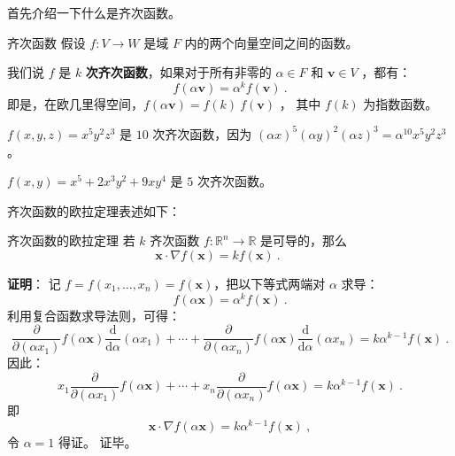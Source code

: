 
\begin{issues}
\end{issues}



首先介绍一下什么是齐次函数。

\begin{definition}{齐次函数}
假设 $f: V \to W $ 是域 $ F $ 内的两个向量空间之间的函数。

我们说 $f$ 是 $k$ \textbf{次齐次函数}，如果对于所有非零的 $\alpha \in F$ 和 $\mathbf{v} \in V$ ，都有：
\begin{equation}
f(\alpha \mathbf{v}) = \alpha^k f(\mathbf{v}) ~.
\end{equation}
即是，在欧几里得空间，$f(\alpha \mathbf{v}) = f(k) \ f(\mathbf{v})$ ， 其中 $f(k)$ 为指数函数。
\end{definition}

\begin{example}{}
$f(x,y,z)=x^5y^2z^3$ 是 $10$ 次齐次函数，因为 $(\alpha x)^5(\alpha y)^2(\alpha z)^3=\alpha^{10}x^5y^2z^3$。

$f(x,y)=x^5 + 2 x^3 y^2 + 9 x y^4$ 是 $5$ 次齐次函数。
\end{example}

齐次函数的欧拉定理表述如下：

\begin{theorem}{齐次函数的欧拉定理}
若 $k$ 齐次函数 $ f:\mathbb{R}^n \to \mathbb{R}$ 是可导的，那么
\begin{equation}
{\displaystyle \mathbf {x} \cdot \nabla f(\mathbf {x} )=kf(\mathbf {x} )~.\qquad }
\end{equation}
\end{theorem}
\textbf{证明}： 记 $f=f(x_{1},\ldots ,x_{n})=f(\mathbf {x} )$，把以下等式两端对 $\alpha$ 求导：
\begin{equation}
{\displaystyle f(\alpha \mathbf {x} )=\alpha ^{k}f(\mathbf {x} )}~.
\end{equation}
利用复合函数求导法则，可得：
\begin{equation}
{\frac {\partial }{\partial (\alpha x_{1})}}f(\alpha \mathbf {x} ){\frac {\mathrm {d} }{\mathrm {d} \alpha }}(\alpha x_{1})+\cdots +{\frac {\partial }{\partial (\alpha x_{n})}}f(\alpha \mathbf {x} ){\frac {\mathrm {d} }{\mathrm {d} \alpha }}(\alpha x_{n})=k\alpha ^{k-1}f(\mathbf {x} )~.
\end{equation}
因此：
\begin{equation}
x_{1}{\frac {\partial }{\partial (\alpha x_{1})}}f(\alpha \mathbf {x} )+\cdots +x_{n}{\frac {\partial }{\partial (\alpha x_{n})}}f(\alpha \mathbf {x} )=k\alpha ^{k-1}f(\mathbf {x} )~.
\end{equation}
即
\begin{equation}
\mathbf {x} \cdot \nabla f(\alpha \mathbf {x} )=k\alpha ^{k-1}f(\mathbf {x} )~,
\end{equation}
令 $\alpha=1$ 得证。 证毕。

